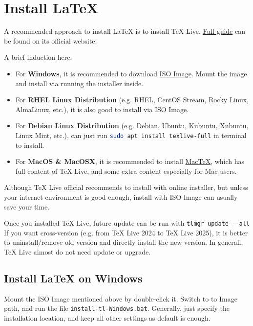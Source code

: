 \chapter{Install \LaTeX{}}
\label{Installation_LaTeX}

A recommended approach to install \LaTeX{} is to install TeX Live. \href{https://www.tug.org/texlive/quickinstall.html}{Full guide} can be found on its official website.

A brief induction here:
\begin{itemize}
    \item For \textbf{Windows}, it is recommended to download \href{https://www.tug.org/texlive/acquire-iso.html}{ISO Image}. Mount the image and install via running the installer inside.
    \item For \textbf{RHEL Linux Distribution} (e.g. RHEL, CentOS Stream, Rocky Linux, AlmaLinux, etc.), it is also good to install via ISO Image.
    \item For \textbf{Debian Linux Distribution} (e.g. Debian, Ubuntu, Kubuntu, Xubuntu, Linux Mint, etc.), can just run \lstinline[language=bash]!sudo apt install texlive-full! in terminal to install.
    \item For \textbf{MacOS \& MacOSX}, it is recommended to install \href{https://www.tug.org/mactex/}{MacTeX}, which has full content of TeX Live, and some extra content especially for Mac users.
\end{itemize}

Although TeX Live official recommends to install with online installer, but unless your internet environment is good enough, install with ISO Image can usually save your time.

Once you installed TeX Live, future update can be run with \lstinline!tlmgr update --all! If you want cross-version (e.g. from TeX Live 2024 to TeX Live 2025), it is better to uninstall/remove old version and directly install the new version. In generall, TeX Live almost do not need update or upgrade.

\section{Install \LaTeX{} on Windows}
\label{Installation_LaTeX_Windows}

Mount the ISO Image mentioned above by double-click it. Switch to to Image path, and run the file \texttt{install-tl-Windows.bat}. Generally, just specify the installation location, and keep all other settings as default is enough.

